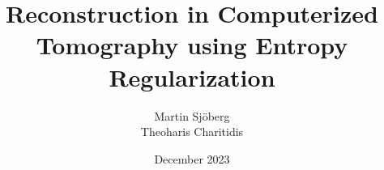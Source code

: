 \documentclass{article}
\begin{document}
\title{Reconstruction in Computerized Tomography using Entropy Regularization}
\author{Martin Sjöberg \\ Theoharis Charitidis}
\date{December 2023}

\maketitle

\end{document}
